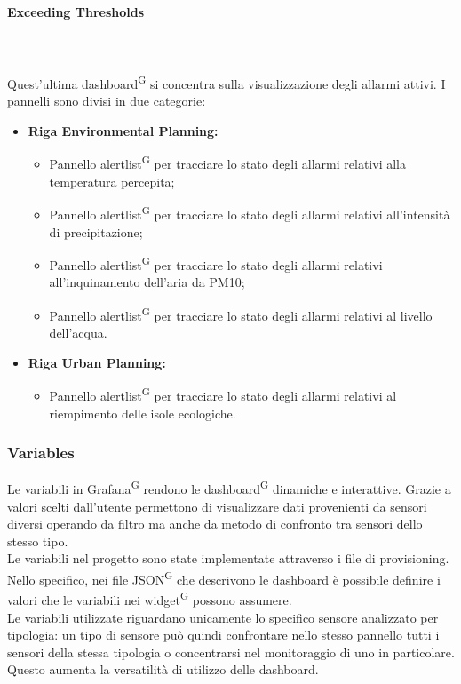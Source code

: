 \documentclass[8pt]{article}
\newcommand{\glossterm}[1]{#1\textsuperscript{G}} %
\newcommand{\subsubsubsection}[1]{\paragraph{#1}\mbox{}\\\\}
\begin{document}
\subsubsubsection{Exceeding Thresholds}
Quest'ultima \glossterm{dashboard} si concentra sulla visualizzazione degli allarmi attivi. I pannelli sono divisi in due categorie:
\begin{itemize}
	\setlength\itemsep{0em}
    \item \textbf{Riga Environmental Planning:}
    \begin{itemize}
	\setlength\itemsep{0em}
        \item Pannello \glossterm{alertlist} per tracciare lo stato degli allarmi relativi alla temperatura percepita;
        \item Pannello \glossterm{alertlist} per tracciare lo stato degli allarmi relativi all'intensità di precipitazione;
        \item Pannello \glossterm{alertlist} per tracciare lo stato degli allarmi relativi all'inquinamento dell'aria da PM10;
        \item Pannello \glossterm{alertlist} per tracciare lo stato degli allarmi relativi al livello dell'acqua.
    \end{itemize}
    \item \textbf{Riga Urban Planning:}
    \begin{itemize}
	\setlength\itemsep{0em}
        \item Pannello \glossterm{alertlist} per tracciare lo stato degli allarmi relativi al riempimento delle isole ecologiche.
    \end{itemize}
\end{itemize}
\subsubsection{Variables}
Le variabili in \glossterm{Grafana} rendono le \glossterm{dashboard} dinamiche e
interattive. Grazie a valori scelti dall'utente permettono di visualizzare dati provenienti da sensori diversi operando da filtro ma anche da metodo di confronto tra sensori dello stesso tipo.
\\Le variabili nel progetto sono state implementate attraverso i file di provisioning. Nello specifico, nei file \glossterm{JSON} che descrivono le dashboard è possibile definire i valori che le variabili nei \glossterm{widget} possono assumere.
\\Le variabili utilizzate riguardano unicamente lo specifico sensore analizzato per tipologia: un tipo di sensore può quindi confrontare nello stesso pannello tutti i sensori della stessa tipologia o concentrarsi nel monitoraggio di uno in particolare. Questo aumenta la versatilità di utilizzo delle dashboard.
\end{document}
